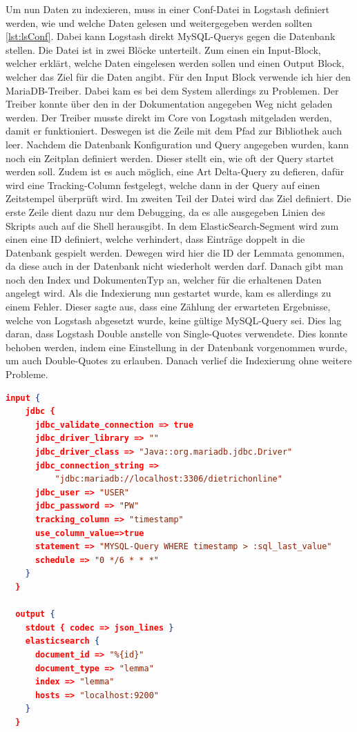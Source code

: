Um nun Daten zu indexieren, muss in einer Conf-Datei in Logstash definiert werden, wie und welche Daten gelesen und weitergegeben werden sollten \ref{lst:lsConf}. Dabei kann Logstash direkt MySQL-Querys gegen die Datenbank stellen. Die Datei ist in zwei Blöcke unterteilt. Zum einen ein Input-Block, welcher erklärt, welche Daten eingelesen werden sollen und einen Output Block, welcher das Ziel für die Daten angibt. Für den Input Block verwende ich hier den MariaDB-Treiber. Dabei kam es bei dem System allerdings zu Problemen. Der Treiber konnte über den in der Dokumentation angegeben Weg nicht geladen werden.  Der Treiber musste direkt im Core von Logstash mitgeladen werden, damit er funktioniert. Deswegen ist die Zeile mit dem Pfad zur Bibliothek auch leer. Nachdem die Datenbank Konfiguration und Query angegeben wurden, kann noch ein Zeitplan definiert werden. Dieser stellt ein, wie oft der Query startet werden soll. Zudem ist es auch möglich, eine Art Delta-Query zu defieren, dafür wird eine Tracking-Column festgelegt, welche dann in der Query auf einen Zeitstempel überprüft wird.
Im zweiten Teil der Datei wird das Ziel definiert. Die erste Zeile dient dazu nur dem Debugging, da es alle ausgegeben Linien des Skripts auch auf die Shell herausgibt. In dem ElasticSearch-Segment wird zum einen eine ID definiert, welche verhindert, dass Einträge doppelt in die Datenbank gespielt werden. Dewegen wird hier die ID der Lemmata genommen, da diese auch in der Datenbank nicht wiederholt werden darf. Danach gibt man noch den Index und DokumentenTyp an, welcher für die erhaltenen Daten angelegt wird. 
Als die Indexierung nun gestartet wurde, kam es allerdings zu einem Fehler. Dieser sagte aus, dass eine Zählung der erwarteten Ergebnisse, welche von Logstash abgesetzt wurde, keine gültige MySQL-Query sei. Dies lag daran, dass Logstash Double anstelle von Single-Quotes verwendete. Dies konnte behoben werden, indem eine Einstellung in der Datenbank vorgenommen wurde, um auch Double-Quotes zu erlauben. 
Danach verlief die Indexierung ohne weitere Probleme.

\begin{lstlisting}[language=json, frame=single, label={lst:lsConf}] 
  input {
    jdbc {
      jdbc_validate_connection => true
      jdbc_driver_library => ""
      jdbc_driver_class => "Java::org.mariadb.jdbc.Driver"
      jdbc_connection_string =>
          "jdbc:mariadb://localhost:3306/dietrichonline"
      jdbc_user => "USER"
      jdbc_password => "PW"
      tracking_column => "timestamp"
      use_column_value=>true
      statement => "MYSQL-Query WHERE timestamp > :sql_last_value"
      schedule => "0 */6 * * *"
    }
  }
  
  output {
    stdout { codec => json_lines }
    elasticsearch {
      document_id => "%{id}"
      document_type => "lemma"
      index => "lemma"
      hosts => "localhost:9200"
    }
  }
\end{lstlisting}

